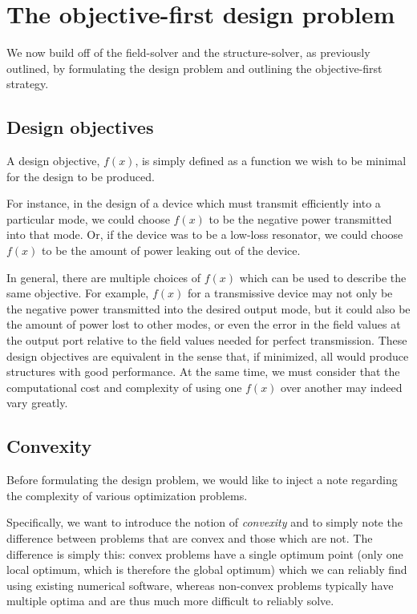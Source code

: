 
\section{The objective-first design problem}
We now build off of the field-solver and the structure-solver,
    as previously outlined,
    by formulating the design problem
    and outlining the objective-first strategy.

\subsection{Design objectives} \label{sec:desobj}
A design objective, $f(x)$, is simply defined as
    a function we wish to be minimal 
    for the design to be produced.

For instance, in the design of a device
    which must transmit efficiently into a particular mode,
    we could choose $f(x)$ to be the negative power transmitted into that mode.
Or, if the device was to be a low-loss resonator,
    we could choose $f(x)$ to be the amount of power leaking 
    out of the device.

In general, there are multiple choices of $f(x)$
    which can be used to describe the same objective.
For example, $f(x)$ for a transmissive device 
    may not only be the negative power transmitted into the desired output mode,
    but it could also be the amount of power lost to other modes,
    or even the error in the field values at the output port
    relative to the field values needed for perfect transmission.
These design objectives are equivalent in the sense that, if minimized, 
    all would produce structures with good performance.
At the same time, we must consider that the computational cost and complexity
    of using one $f(x)$ over another may indeed vary greatly.

\subsection{Convexity}
Before formulating the design problem,
    we would like to inject a note regarding the complexity of various 
    optimization problems.

Specifically, we want to introduce the notion of \emph{convexity} %
    and to simply note the difference between problems that
    are convex and those which are not.
The difference is simply this:
    convex problems have a single optimum point
    (only one local optimum, which is therefore the global optimum)
    which we can reliably find using existing numerical software,
    whereas non-convex problems typically have multiple optima 
    and are thus much more difficult to reliably solve.

